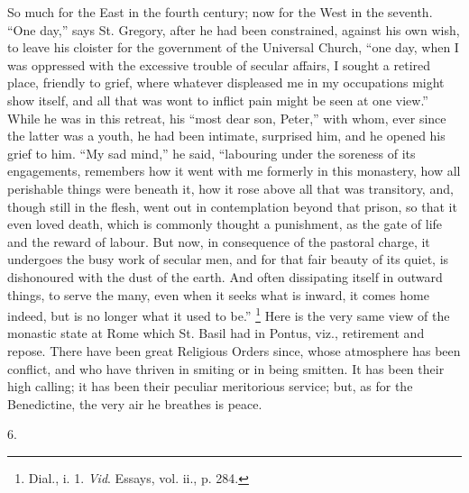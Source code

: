 So much for the East in the fourth century; now for the West in the
seventh. ``One day,'' says St. Gregory, after he had been
constrained, against his own wish, to leave his cloister for the
government of the Universal Church, ``one day, when I was
oppressed with the excessive trouble of secular affairs, I sought a
retired place, friendly to grief, where whatever displeased me in my
occupations might show itself, and all that was wont to inflict pain
might be seen at one view.'' While he was in this retreat, his
``most dear son, Peter,'' with whom, ever since the latter was
a youth, he had been intimate, surprised him, and he opened his grief
to him. ``My sad mind,'' he said, ``labouring under the
soreness of its engagements, remembers how it went with me formerly in
this monastery, how all perishable things were beneath it, how it rose
above all that was transitory, and, though still in the flesh, went
out in contemplation beyond that prison, so that it even loved death,
which is commonly thought a punishment, as the gate of life and the
reward of labour. But now, in consequence of the pastoral charge, it
undergoes the busy work of secular men, and for that fair beauty of
its quiet, is dishonoured with the dust of the earth. And often
dissipating itself in outward things, to serve the many, even when it
seeks what is inward, it comes home indeed, but is no longer what it
used to be.'' \footnote{Dial., i. 1. \emph{Vid}.
Essays, vol. ii., p. 284.} Here
is the very same view of the monastic state at Rome which St. Basil
had in Pontus, viz., retirement and repose. There have been great
Religious Orders since, whose atmosphere has been conflict, and
who have thriven in smiting or in being smitten. It has been their
high calling; it has been their peculiar meritorious service; but, as
for the Benedictine, the very air he breathes is peace.

6.

